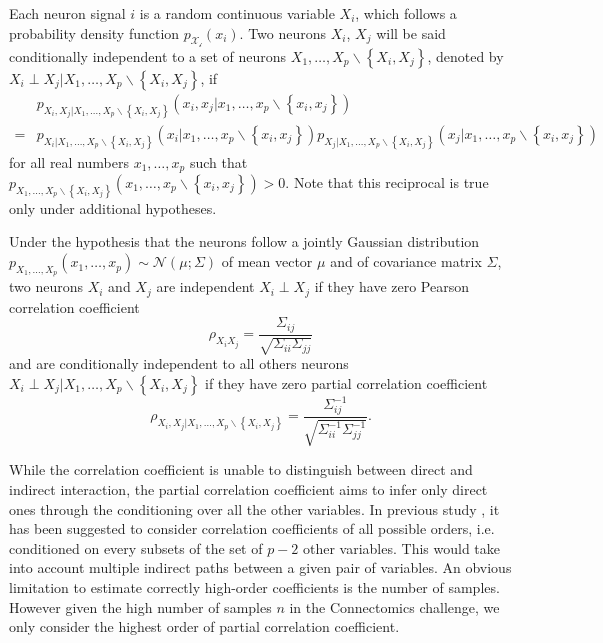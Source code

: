 \documentclass[wcp]{jmlr}
\begin{document}
Each neuron signal $i$ is a random continuous variable $X_i$,
which follows a probability density function $p_\mathcal{X_i}(x_i)$.
Two neurons $X_i$, $X_j$ will be said conditionally independent
to a set of neurons $X_1,\ldots,X_p \backslash \left\{X_i, X_j\right\}$, denoted
by  $X_i \perp X_j | X_1,\ldots,X_p \backslash \left\{X_i, X_j\right\}$,  if
\begin{align*}
&p_{X_i, X_j | X_1,\ldots,X_p \backslash \left\{X_i, X_j\right\}}
    (x_i, x_j | x_1,\ldots,x_p \backslash \left\{x_i, x_j\right\}) \\
=&p_{X_i | X_1,\ldots,X_p \backslash \left\{X_i, X_j\right\}}
    (x_i | x_1,\ldots,x_p \backslash \left\{x_i, x_j\right\})
p_{X_j | X_1,\ldots,X_p \backslash \left\{X_i, X_j\right\}}
    (x_j | x_1,\ldots,x_p \backslash \left\{x_i, x_j\right\})
\end{align*}
for all real numbers $x_1,\ldots,x_p $ such that
$p_{X_1,\ldots,X_p \backslash \left\{X_i, X_j\right\}}
(x_1,\ldots,x_p \backslash \left\{x_i, x_j\right\}) > 0$. Note that this
reciprocal is true only under additional hypotheses.

Under the hypothesis that the neurons follow a jointly Gaussian distribution
$p_{X_1,\ldots,X_p}(x_1,\ldots,x_p) \sim \mathcal{N}(\mu; \Sigma)$
of mean vector $\mu$ and of covariance matrix $\Sigma$, two neurons $X_i$
and $X_j$ are independent $X_i \perp X_j$ if they have zero Pearson correlation
coefficient
\[
\rho_{X_iX_j} = \frac{\Sigma_{ij}}{\sqrt{\Sigma_{ii} \Sigma_{jj}}}
\]
and are conditionally independent to all others neurons
$X_i \perp X_j | X_1,\ldots,X_p \backslash \left\{X_i, X_j\right\}$ if they
have zero partial correlation coefficient
\[
\rho_{X_i, X_j | X_1,\ldots,X_p \backslash \left\{X_i, X_j\right\}} =
\frac{\Sigma^{-1}_{ij}}{\sqrt{\Sigma^{-1}_{ii} \Sigma^{-1}_{jj}}}.
\]

While the correlation coefficient is unable to distinguish between
direct and indirect interaction, the partial correlation coefficient
aims to infer only direct ones through the conditioning over all the other
variables. In previous study \cite{shipley2002cause}, it has been suggested to
consider correlation coefficients of all possible orders,
i.e. conditioned on every subsets of the set of $p-2$ other variables. This
would take into account multiple indirect paths between a given pair of
variables. An obvious limitation to estimate correctly high-order coefficients
is the number of samples. However given the high number of samples $n$
in the Connectomics challenge, we only consider the highest order of partial
correlation coefficient.
\end{document}
